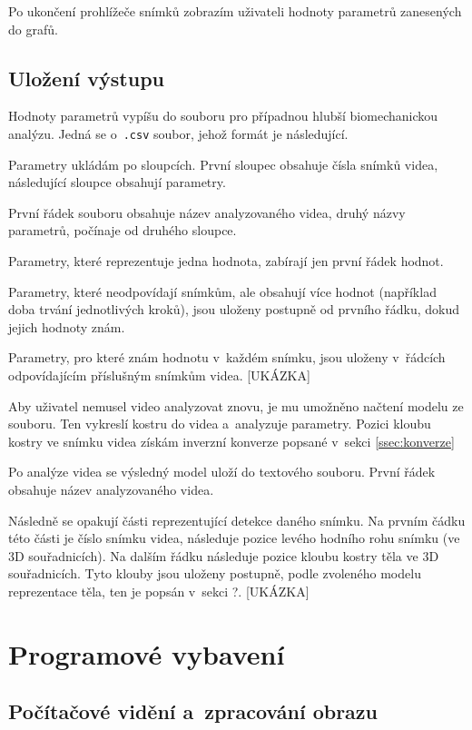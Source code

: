 Po ukončení prohlížeče snímků zobrazím uživateli hodnoty parametrů zanesených do grafů.

\subsection{Uložení výstupu}

Hodnoty parametrů vypíšu do souboru pro případnou hlubší biomechanickou analýzu. Jedná se o~\texttt{.csv} soubor, jehož formát je následující.

Parametry ukládám po sloupcích. První sloupec obsahuje čísla snímků videa, následující sloupce obsahují parametry.

První řádek souboru obsahuje název analyzovaného videa, druhý názvy parametrů, počínaje od druhého sloupce.

Parametry, které reprezentuje jedna hodnota, zabírají jen první řádek hodnot.

Parametry, které neodpovídají snímkům, ale obsahují více hodnot (například doba trvání jednotlivých kroků), jsou uloženy postupně od prvního řádku, dokud jejich hodnoty znám.

Parametry, pro které znám hodnotu v~každém snímku, jsou uloženy v~řádcích odpovídajícím příslušným snímkům videa.
[UKÁZKA]

Aby uživatel nemusel video analyzovat znovu, je mu umožněno načtení modelu ze souboru. Ten vykreslí kostru do videa a~analyzuje parametry. Pozici kloubu kostry ve snímku videa získám inverzní konverze popsané v~sekci \ref{ssec:konverze}

Po analýze videa se výsledný model uloží do textového souboru. První řádek obsahuje název analyzovaného videa.

Následně se opakují části reprezentující detekce daného snímku. Na prvním čádku této části je číslo snímku videa, následuje pozice levého hodního rohu snímku (ve 3D souřadnicích). Na dalším řádku následuje pozice kloubu kostry těla ve 3D souřadnicích. Tyto klouby jsou uloženy postupně, podle zvoleného modelu reprezentace těla, ten je popsán v~sekci ?. [UKÁZKA]

\section{Programové vybavení}

\subsection{Počítačové vidění a~zpracování obrazu}

